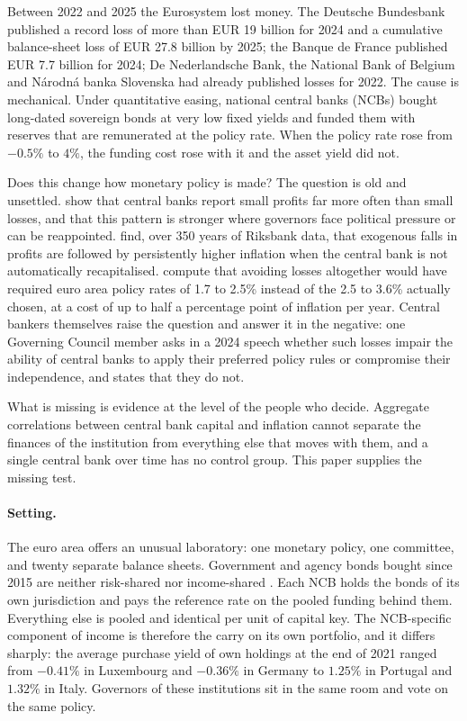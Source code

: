 \documentclass[11pt]{article}
\theoremstyle{plain}
\begin{document}
Between 2022 and 2025 the Eurosystem lost money. The Deutsche Bundesbank published a record loss of more than EUR 19 billion for 2024 and a cumulative balance-sheet loss of EUR 27.8 billion by 2025; the Banque de France published EUR 7.7 billion for 2024; De Nederlandsche Bank, the National Bank of Belgium and N\'arodn\'a banka Slovenska had already published losses for 2022. The cause is mechanical. Under quantitative easing, national central banks (NCBs) bought long-dated sovereign bonds at very low fixed yields and funded them with reserves that are remunerated at the policy rate. When the policy rate rose from $-0.5\%$ to $4\%$, the funding cost rose with it and the asset yield did not.

Does this change how monetary policy is made? The question is old and unsettled. \citet{goncharov2023} show that central banks report small profits far more often than small losses, and that this pattern is stronger where governors face political pressure or can be reappointed. \citet{grodecka2025} find, over 350 years of Riksbank data, that exogenous falls in profits are followed by persistently higher inflation when the central bank is not automatically recapitalised. \citet{gebauer2024} compute that avoiding losses altogether would have required euro area policy rates of 1.7 to 2.5\% instead of the 2.5 to 3.6\% actually chosen, at a cost of up to half a percentage point of inflation per year. Central bankers themselves raise the question and answer it in the negative: one Governing Council member asks in a 2024 speech whether such losses impair the ability of central banks to apply their preferred policy rules or compromise their independence, and states that they do not.

What is missing is evidence at the level of the people who decide. Aggregate correlations between central bank capital and inflation cannot separate the finances of the institution from everything else that moves with them, and a single central bank over time has no control group. This paper supplies the missing test.

\paragraph{Setting.} The euro area offers an unusual laboratory: one monetary policy, one committee, and twenty separate balance sheets. Government and agency bonds bought since 2015 are neither risk-shared nor income-shared \citep{arrata2026}. Each NCB holds the bonds of its own jurisdiction and pays the reference rate on the pooled funding behind them. Everything else is pooled and identical per unit of capital key. The NCB-specific component of income is therefore the carry on its own portfolio, and it differs sharply: the average purchase yield of own holdings at the end of 2021 ranged from $-0.41\%$ in Luxembourg and $-0.36\%$ in Germany to $1.25\%$ in Portugal and $1.32\%$ in Italy. Governors of these institutions sit in the same room and vote on the same policy.
\end{document}
